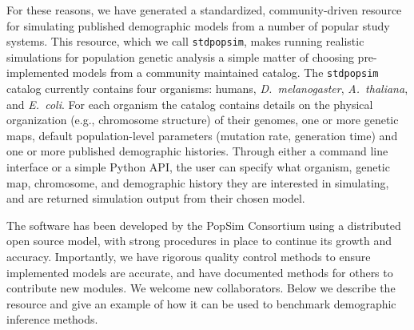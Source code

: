 \documentclass[12pt,halfline,a4paper]{ouparticle}
\newcommand{\stdpopsim}{\texttt{stdpopsim}\xspace}
\begin{document}
For these reasons, we have generated a standardized, community-driven resource
for simulating published demographic models from a number of popular study systems.
This resource, which we call \texttt{stdpopsim}, makes running
realistic simulations for population genetic analysis a simple matter of
choosing pre-implemented models from a community maintained catalog.
The \stdpopsim catalog currently contains four organisms: humans,
\emph{D.~melanogaster}, \emph{A.~thaliana}, and \emph{E.~coli}. For each
organism the catalog contains details on the physical organization (e.g., chromosome structure)
of their genomes, one or more genetic maps, default population-level parameters (mutation rate,
generation time) and one or more published demographic histories. Through
either a command line interface or a simple Python API, the user can specify what
organism, genetic map, chromosome, and demographic history they are interested in simulating, and are returned
simulation output from their chosen model.

The software has been developed by the PopSim Consortium using a
distributed open source model, with strong procedures in place
to continue its growth and accuracy. 
Importantly, we have rigorous quality control methods to ensure implemented models are accurate,
and have documented methods for others to contribute new modules.
We welcome new collaborators.
Below we describe the resource and give an
example of how it can be used to benchmark demographic inference methods.
\end{document}
